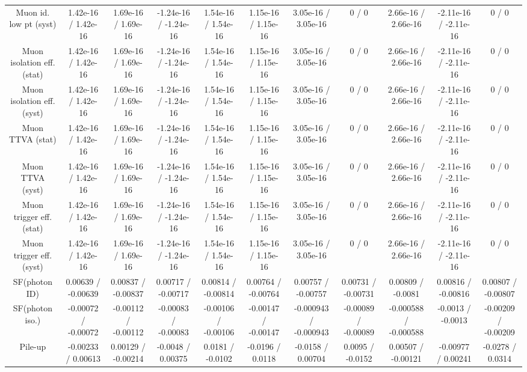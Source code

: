 \begin{table}[htbp]
\begin{center}
\begin{tabular}{|c|c|c|c|c|c|c|c|c|c|c|}
  Muon id. low pt (syst) & 1.42e-16 / 1.42e-16 & 1.69e-16 / 1.69e-16 & -1.24e-16 / -1.24e-16 & 1.54e-16 / 1.54e-16 & 1.15e-16 / 1.15e-16 & 3.05e-16 / 3.05e-16 & 0 / 0 & 2.66e-16 / 2.66e-16 & -2.11e-16 / -2.11e-16 & 0 / 0 \\ 
  Muon isolation eff. (stat) & 1.42e-16 / 1.42e-16 & 1.69e-16 / 1.69e-16 & -1.24e-16 / -1.24e-16 & 1.54e-16 / 1.54e-16 & 1.15e-16 / 1.15e-16 & 3.05e-16 / 3.05e-16 & 0 / 0 & 2.66e-16 / 2.66e-16 & -2.11e-16 / -2.11e-16 & 0 / 0 \\ 
  Muon isolation eff. (syst) & 1.42e-16 / 1.42e-16 & 1.69e-16 / 1.69e-16 & -1.24e-16 / -1.24e-16 & 1.54e-16 / 1.54e-16 & 1.15e-16 / 1.15e-16 & 3.05e-16 / 3.05e-16 & 0 / 0 & 2.66e-16 / 2.66e-16 & -2.11e-16 / -2.11e-16 & 0 / 0 \\ 
  Muon TTVA (stat) & 1.42e-16 / 1.42e-16 & 1.69e-16 / 1.69e-16 & -1.24e-16 / -1.24e-16 & 1.54e-16 / 1.54e-16 & 1.15e-16 / 1.15e-16 & 3.05e-16 / 3.05e-16 & 0 / 0 & 2.66e-16 / 2.66e-16 & -2.11e-16 / -2.11e-16 & 0 / 0 \\ 
  Muon TTVA (syst) & 1.42e-16 / 1.42e-16 & 1.69e-16 / 1.69e-16 & -1.24e-16 / -1.24e-16 & 1.54e-16 / 1.54e-16 & 1.15e-16 / 1.15e-16 & 3.05e-16 / 3.05e-16 & 0 / 0 & 2.66e-16 / 2.66e-16 & -2.11e-16 / -2.11e-16 & 0 / 0 \\ 
  Muon trigger eff. (stat) & 1.42e-16 / 1.42e-16 & 1.69e-16 / 1.69e-16 & -1.24e-16 / -1.24e-16 & 1.54e-16 / 1.54e-16 & 1.15e-16 / 1.15e-16 & 3.05e-16 / 3.05e-16 & 0 / 0 & 2.66e-16 / 2.66e-16 & -2.11e-16 / -2.11e-16 & 0 / 0 \\ 
  Muon trigger eff. (syst) & 1.42e-16 / 1.42e-16 & 1.69e-16 / 1.69e-16 & -1.24e-16 / -1.24e-16 & 1.54e-16 / 1.54e-16 & 1.15e-16 / 1.15e-16 & 3.05e-16 / 3.05e-16 & 0 / 0 & 2.66e-16 / 2.66e-16 & -2.11e-16 / -2.11e-16 & 0 / 0 \\ 
  SF(photon ID) & 0.00639 / -0.00639 & 0.00837 / -0.00837 & 0.00717 / -0.00717 & 0.00814 / -0.00814 & 0.00764 / -0.00764 & 0.00757 / -0.00757 & 0.00731 / -0.00731 & 0.00809 / -0.0081 & 0.00816 / -0.00816 & 0.00807 / -0.00807 \\ 
  SF(photon iso.) & -0.00072 / -0.00072 & -0.00112 / -0.00112 & -0.00083 / -0.00083 & -0.00106 / -0.00106 & -0.00147 / -0.00147 & -0.000943 / -0.000943 & -0.00089 / -0.00089 & -0.000588 / -0.000588 & -0.0013 / -0.0013 & -0.00209 / -0.00209 \\ 
  Pile-up & -0.00233 / 0.00613 & 0.00129 / -0.00214 & -0.0048 / 0.00375 & 0.0181 / -0.0102 & -0.0196 / 0.0118 & -0.0158 / 0.00704 & 0.0095 / -0.0152 & 0.00507 / -0.00121 & -0.00977 / 0.00241 & -0.0278 / 0.0314 \\ 

\end{tabular}
\end{center}
\end{table}
